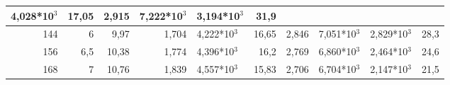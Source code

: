 \begin{table}[H]
{\begin{tabular}{|rr|rrl|rrl|l|r|}
  4,028*10$^3$ &
  \multicolumn{1}{r|}{17,05} &
  \multicolumn{1}{r|}{2,915} &
  7,222*10$^3$ &
  3,194*10$^3$ &
  31,9 \\ \hline
\multicolumn{1}{|r|}{144} &
  6 &
  \multicolumn{1}{r|}{9,97} &
  \multicolumn{1}{r|}{1,704} &
  4,222*10$^3$ &
  \multicolumn{1}{r|}{16,65} &
  \multicolumn{1}{r|}{2,846} &
  7,051*10$^3$ &
  2,829*10$^3$ &
  28,3 \\ \hline
\multicolumn{1}{|r|}{156} &
  6,5 &
  \multicolumn{1}{r|}{10,38} &
  \multicolumn{1}{r|}{1,774} &
  4,396*10$^3$ &
  \multicolumn{1}{r|}{16,2} &
  \multicolumn{1}{r|}{2,769} &
  6,860*10$^3$ &
  2,464*10$^3$ &
  24,6 \\ \hline
\multicolumn{1}{|r|}{168} &
  7 &
  \multicolumn{1}{r|}{10,76} &
  \multicolumn{1}{r|}{1,839} &
  4,557*10$^3$ &
  \multicolumn{1}{r|}{15,83} &
  \multicolumn{1}{r|}{2,706} &
  6,704*10$^3$ &
  2,147*10$^3$ &
  21,5 \\ \hline
\end{tabular}%
}
\end{table}


